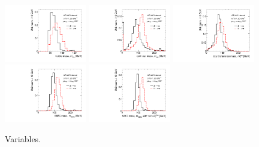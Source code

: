 \begin{figure}[tp]
  \centering
  \includegraphics[width=0.32\textwidth]{figures/mtautau/mtautau-vbf-mvis}
  \includegraphics[width=0.32\textwidth]{figures/mtautau/mtautau-vbf-mcol}
  \includegraphics[width=0.32\textwidth]{figures/mtautau/mtautau-vbf-mttot}
  \includegraphics[width=0.32\textwidth]{figures/mtautau/mtautau-vbf-mMMC}
  \includegraphics[width=0.32\textwidth]{figures/mtautau/mtautau-vbf-mMMC_Truth}
  \caption{Variables.}
  \label{fig:mtautau-vbf}
\end{figure}

\clearpage


